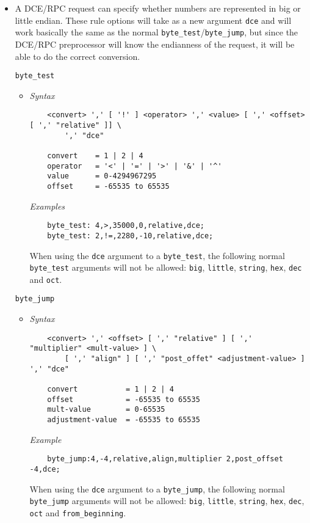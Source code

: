 \documentclass[english]{report}
\begin{document}
\begin{itemize}

\item[] A DCE/RPC request can specify whether numbers are represented in big or
little endian. These rule options will take as a new argument \texttt{dce} and
will work basically the same as the normal
\texttt{byte\_test}/\texttt{byte\_jump}, but since the DCE/RPC preprocessor
will know the endianness of the request, it will be able to do the correct
conversion.

\texttt{byte\_test}
\begin{itemize}
\item[] \textit{Syntax}
\footnotesize
\begin{verbatim}
    <convert> ',' [ '!' ] <operator> ',' <value> [ ',' <offset> [ ',' "relative" ]] \
        ',' "dce"

    convert    = 1 | 2 | 4
    operator   = '<' | '=' | '>' | '&' | '^'
    value      = 0-4294967295
    offset     = -65535 to 65535
\end{verbatim}
\normalsize

\textit{Examples}
\footnotesize
\begin{verbatim}
    byte_test: 4,>,35000,0,relative,dce;
    byte_test: 2,!=,2280,-10,relative,dce;
\end{verbatim}
\normalsize

When using the \texttt{dce} argument to a \texttt{byte\_test}, the following
normal \texttt{byte\_test} arguments will not be allowed: \texttt{big},
\texttt{little}, \texttt{string}, \texttt{hex}, \texttt{dec} and \texttt{oct}.
\end{itemize}

\texttt{byte\_jump}
\begin{itemize}
\item[] \textit{Syntax}
\footnotesize
\begin{verbatim}
    <convert> ',' <offset> [ ',' "relative" ] [ ',' "multiplier" <mult-value> ] \
        [ ',' "align" ] [ ',' "post_offet" <adjustment-value> ] ',' "dce"

    convert           = 1 | 2 | 4
    offset            = -65535 to 65535
    mult-value        = 0-65535
    adjustment-value  = -65535 to 65535
\end{verbatim}
\normalsize

\textit{Example}
\footnotesize
\begin{verbatim}
    byte_jump:4,-4,relative,align,multiplier 2,post_offset -4,dce;
\end{verbatim}
\normalsize

When using the \texttt{dce} argument to a \texttt{byte\_jump}, the following
normal \texttt{byte\_jump} arguments will not be allowed: \texttt{big},
\texttt{little}, \texttt{string}, \texttt{hex}, \texttt{dec}, \texttt{oct} and
\texttt{from\_beginning}.

\end{itemize}
\end{itemize}
\end{document}
